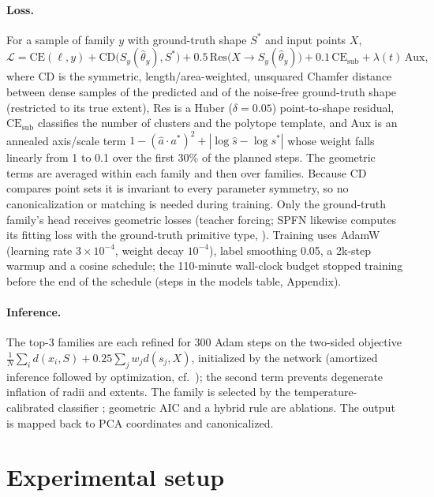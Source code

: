 \documentclass[10pt]{article}
\begin{document}
\paragraph{Loss.} For a sample of family $y$ with ground-truth shape $S^\ast$ and input points $X$,
\begin{equation}
\mathcal{L}=\mathrm{CE}(\ell,y)+\mathrm{CD}\big(S_y(\hat\theta_y),S^\ast\big)+0.5\,\mathrm{Res}\big(X\to S_y(\hat\theta_y)\big)+0.1\,\mathrm{CE}_{\mathrm{sub}}+\lambda(t)\,\mathrm{Aux},
\end{equation}
where CD is the symmetric, length/area-weighted, unsquared Chamfer distance between dense samples of the predicted and of the noise-free ground-truth shape (restricted to its true extent), Res is a Huber ($\delta=0.05$) point-to-shape residual, $\mathrm{CE}_{\mathrm{sub}}$ classifies the number of clusters and the polytope template, and Aux is an annealed axis/scale term $1-(\hat a\cdot a^\ast)^2+|\log\hat s-\log s^\ast|$ whose weight falls linearly from 1 to 0.1 over the first 30\% of the planned steps. The geometric terms are averaged within each family and then over families. Because CD compares point sets it is invariant to every parameter symmetry, so no canonicalization or matching is needed during training. Only the ground-truth family's head receives geometric losses (teacher forcing; SPFN likewise computes its fitting loss with the ground-truth primitive type, \citealp{li2019spfn}). Training uses AdamW (learning rate $3\times10^{-4}$, weight decay $10^{-4}$), label smoothing 0.05, a 2k-step warmup and a cosine schedule; the 110-minute wall-clock budget stopped training before the end of the schedule (steps in the models table, Appendix).

\paragraph{Inference.} The top-3 families are each refined for 300 Adam steps on the two-sided objective $\frac{1}{N}\sum_i d(x_i,S)+0.25\sum_j w_j d(s_j,X)$, initialized by the network (amortized inference followed by optimization, cf.\ \citealp{kolotouros2019spin}); the second term prevents degenerate inflation of radii and extents. The family is selected by the temperature-calibrated classifier \citep{guo2017calibration}; geometric AIC \citep{kanatani2004gaic} and a hybrid rule are ablations. The output is mapped back to PCA coordinates and canonicalized.

\section{Experimental setup}
\label{sec:setup}
\end{document}
